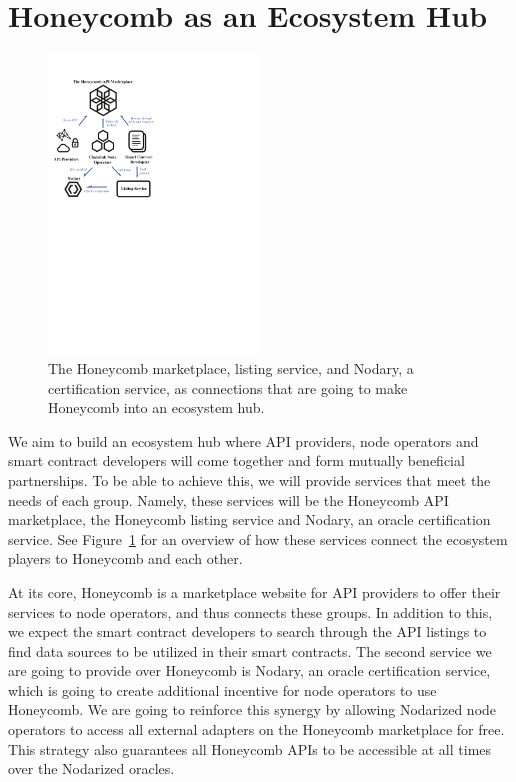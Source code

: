 \documentclass[12pt]{article}
\begin{document}
\section{Honeycomb as an Ecosystem Hub}
\label{sec:honeycombasanecosystemhub}

\begin{figure}
	\centering
	\includegraphics[width=0.5\textwidth]{Figures/ecosystem}
	\caption{The Honeycomb marketplace, listing service, and Nodary, a certification service, as connections that are going to make Honeycomb into an ecosystem hub.}
	\label{fig:ecosystem}
\end{figure}

We aim to build an ecosystem hub where API providers, node operators and smart contract developers will come together and form mutually beneficial partnerships.
To be able to achieve this, we will provide services that meet the needs of each group.
Namely, these services will be the Honeycomb API marketplace, the Honeycomb listing service and Nodary, an oracle certification service.
See Figure~\ref{fig:ecosystem} for an overview of how these services connect the ecosystem players to Honeycomb and each other.

At its core, Honeycomb is a marketplace website for API providers to offer their services to node operators, and thus connects these groups.
In addition to this, we expect the smart contract developers to search through the API listings to find data sources to be utilized in their smart contracts.
The second service we are going to provide over Honeycomb is Nodary, an oracle certification service, which is going to create additional incentive for node operators to use Honeycomb.
We are going to reinforce this synergy by allowing Nodarized node operators to access all external adapters on the Honeycomb marketplace for free.
This strategy also guarantees all Honeycomb APIs to be accessible at all times over the Nodarized oracles.
\end{document}
